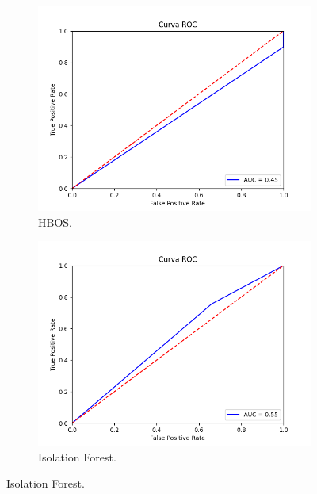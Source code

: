 \begin{figure}[H]
	\centering
	\begin{subfigure}{.49\textwidth}
		\centering
		\includegraphics[scale=0.42]{imagenes/roc/HBOS_roc.png}
		\caption{HBOS.}
	\end{subfigure}
	\begin{subfigure}{.49\textwidth}
		\centering
		\includegraphics[scale=0.42]{imagenes/roc/Isolation-Forest_roc.png}
		\caption{Isolation Forest.}
	\end{subfigure}
	\label{img:roc4}
\end{figure}

